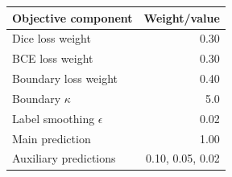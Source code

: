 \begin{tabular}{lr}
\hline
Objective component & Weight/value \\
\hline
Dice loss weight & 0.30 \\
BCE loss weight & 0.30 \\
Boundary loss weight & 0.40 \\
Boundary $\kappa$ & 5.0 \\
Label smoothing $\epsilon$ & 0.02 \\
Main prediction & 1.00 \\
Auxiliary predictions & 0.10, 0.05, 0.02 \\
\hline
\end{tabular}

